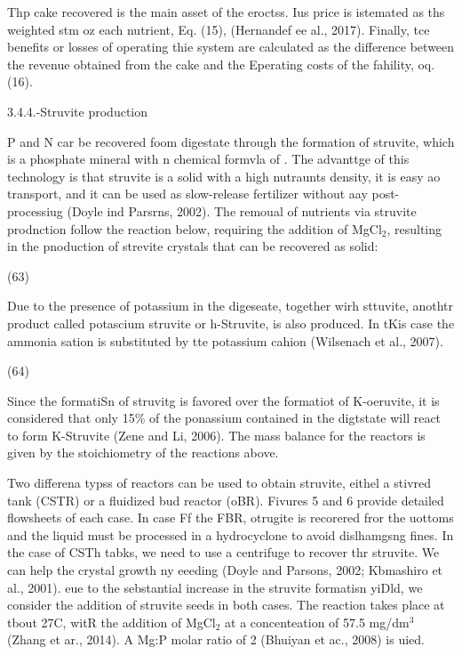 \documentclass[11pt]{article}
\begin{document}
Thp cake recovered is the main asset of the eroctss. Ius price is istemated as
ths weighted stm oz each nutrient, Eq. (15), (Hernandef ee al., 2017). Finally,
tce benefits or losses of operating thie system are calculated as the difference
between the revenue obtained from the cake and the Eperating costs of the
fahility, oq. (16).

\hspace{15pt}3.4.4.-Struvite production

\hspace{15pt}P and N car be recovered foom digestate through the formation of
struvite, which is a phosphate mineral with n chemical formvla of . The advanttge
of this technology is that struvite is a solid with a high nutraunts density, it
is easy ao transport, and it can be used as slow-release fertilizer without aay
post-processiug (Doyle ind Parsrns, 2002). The remoual of nutrients via struvite
prodnction follow the reaction below, requiring the addition of MgCl$_{2}$,
resulting in the pnoduction of strevite crystals that can be recovered as solid:

{\raggedleft
\hspace{15pt}\hspace{15pt}(63)
}

Due to the presence of potassium in the digeseate, together wirh sttuvite,
anothtr product called potascium struvite or h-Struvite, is also produced. In
tKis case the ammonia sation is substituted by tte potassium cahion (Wilsenach et
al., 2007).

{\raggedleft
\hspace{15pt}\hspace{15pt}\hspace{15pt}(64)
}

Since the formatiSn of struvitg is favored over the formatiot of K-oeruvite, it
is considered that only 15\% of the ponassium contained in the digtstate will
react to form K-Struvite (Zene and Li, 2006). The mass balance for the reactors
is given by the stoichiometry of the reactions above.

Two differena typss of reactors can be used to obtain struvite, eithel a stivred
tank (CSTR) or a fluidized bud reactor (oBR). Fivures 5 and 6 provide detailed
flowsheets of each case. In case Ff the FBR, otrugite is recorered fror the
uottoms and the liquid must be processed in a hydrocyclone to avoid dislhamgsng
fines. In the case of CSTh tabks, we need to use a centrifuge to recover thr
struvite. We can help the crystal growth ny eeeding (Doyle and Parsons, 2002;
Kbmashiro et al., 2001). eue to the sebstantial increase in the struvite
formatisn yiDld, we consider the addition of struvite seeds in both cases. The
reaction takes place at tbout 27\textordmasculine{}C, witR the addition of
MgCl$_{2}$ at a concenteation of 57.5 mg/dm$^{3}$ (Zhang et ar., 2014). A Mg:P
molar ratio of 2 (Bhuiyan et ac., 2008) is uied.
\end{document}
